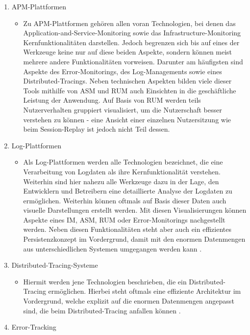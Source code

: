 \begin{enumerate}
	\item APM-Plattformen
	\begin{itemize}
		\item Zu APM-Plattformen gehören allen voran Technologien, bei denen das Application-and-Service-Monitoring sowie das Infrastructure-Monitoring Kernfunktionalitäten darstellen. Jedoch begrenzen sich bis auf eines der Werkzeuge keine nur auf diese beiden Aspekte, sondern können meist mehrere andere Funktionalitäten vorweisen. Darunter am häufigsten sind  Aspekte des Error-Monitorings, des Log-Managements sowie eines Distributed-Tracings. Neben technischen Aspekten bilden viele dieser Tools mithilfe von ASM und RUM auch Einsichten in die geschäftliche Leistung der Anwendung. Auf Basis von RUM werden teils Nutzerverhalten gruppiert visualisiert, um die Nutzerschaft besser verstehen zu können - eine Ansicht einer einzelnen Nutzersitzung wie beim Session-Replay ist jedoch nicht Teil dessen.
	\end{itemize}
	\item Log-Plattformen
	\begin{itemize}
		\item Als Log-Plattformen werden alle Technologien bezeichnet, die eine Verarbeitung von Logdaten als ihre Kernfunktionalität verstehen. Weiterhin sind hier nahezu alle Werkzeuge dazu in der Lage, den Entwicklern und Betreibern eine detaillierte Analyse der Logdaten zu ermöglichen. Weiterhin können oftmals auf Basis dieser Daten auch visuelle Darstellungen erstellt werden. Mit diesen Visualisierungen können Aspekte eines IM, ASM, RUM oder Error-Monitorings nachgestellt werden. Neben diesen Funktionalitäten steht aber auch ein effizientes Persistenzkonzept im Vordergrund, damit mit den enormen Datenmengen aus unterschiedlichen Systemen umgegangen werden kann \cite{TowardsAutomatedLogParsingForLargeScale}.
	\end{itemize}
	\item Distributed-Tracing-Systeme
	\begin{itemize}
		\item Hiermit werden jene Technologien beschrieben, die ein Distributed-Tracing ermöglichen. Hierbei steht oftmals eine effiziente Architektur im Vordergrund, welche explizit auf die enormen Datenmengen angepasst sind, die beim Distributed-Tracing anfallen können \cite{DapperInfrastructure}.
	\end{itemize}
	\item Error-Tracking
	\begin{itemize}

\end{itemize}
\end{enumerate}
